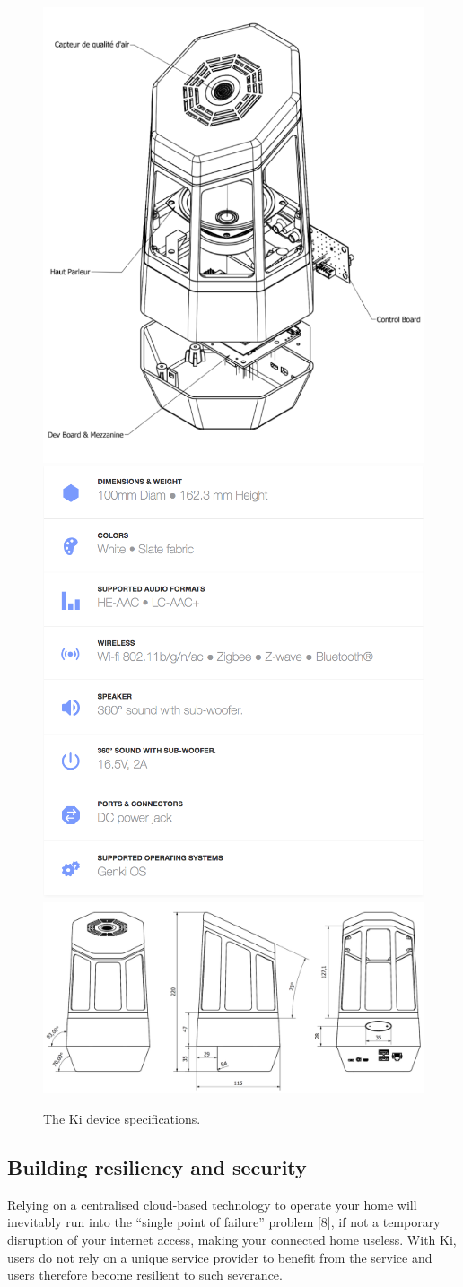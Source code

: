 \begin{figure}
	\includegraphics[width=0.49\linewidth, trim= 0cm 0cm 0cm 0cm, clip]{Figures/domoE.png}
	\includegraphics[width=0.49\linewidth, trim= 0cm 0cm 0cm 0cm, clip]{Figures/domoS.png}
	\includegraphics[width=\linewidth, trim= 0cm 0cm 0cm 0cm, clip]{Figures/domoB.png}
	\caption{The Ki device specifications.}
	\label{fig:domo}
\end{figure}

\subsection{Building resiliency and security}
Relying on a centralised cloud-based technology to operate your home will inevitably run into the “single point of failure” problem [8], if not a temporary disruption of your internet access, making your connected home useless. With Ki, users do not rely on a unique service provider to benefit from the service and users therefore become resilient to such severance. 

